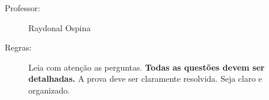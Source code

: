 \documentclass[a4paper,12pt,oneside,twocolumn]{Config/milktest}
\begin{document}
\beb
{\small
\begin{description}
\item[Professor:] Raydonal Ospina

\item[Regras:] Leia com atenção as perguntas. {\bf Todas as questões devem ser detalhadas.} A prova deve ser claramente resolvida. Seja claro e organizado. 
\end{description}
}
\eeb

\balance




\end{document}
